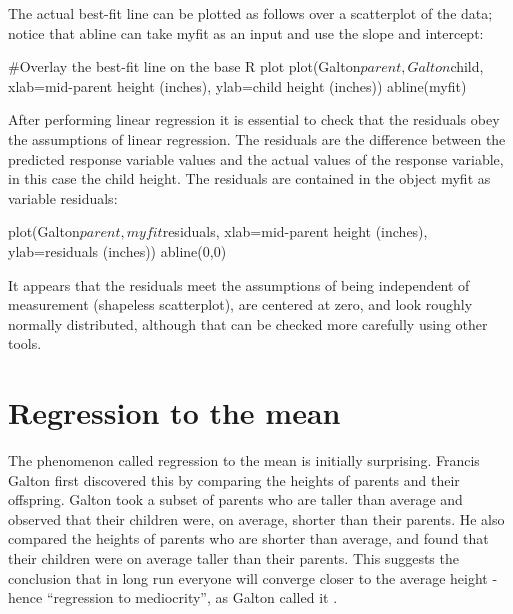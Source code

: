 \documentclass[
  letterpaper,
  DIV=11,
  numbers=noendperiod]{scrreprt}
\newenvironment{Shaded}{\begin{snugshade}}{\end{snugshade}}
\newcommand{\NormalTok}[1]{\textcolor[rgb]{0.00,0.23,0.31}{#1}}
\begin{document}
The actual best-fit line can be plotted as follows over a scatterplot of
the data; notice that abline can take myfit as an input and use the
slope and intercept:

\begin{Shaded}
\begin{Highlighting}[]
\NormalTok{\#Overlay the best{-}fit line on the base R plot}
\NormalTok{plot(Galton$parent, Galton$child, xlab=\textquotesingle{}mid{-}parent height (inches)\textquotesingle{}, ylab=\textquotesingle{}child height (inches)\textquotesingle{})}
\NormalTok{abline(myfit)}
\end{Highlighting}
\end{Shaded}

After performing linear regression it is essential to check that the
residuals obey the assumptions of linear regression. The residuals are
the difference between the predicted response variable values and the
actual values of the response variable, in this case the child height.
The residuals are contained in the object myfit as variable residuals:

\begin{Shaded}
\begin{Highlighting}[]
\NormalTok{plot(Galton$parent, myfit$residuals, xlab=\textquotesingle{}mid{-}parent height (inches)\textquotesingle{}, ylab=\textquotesingle{}residuals (inches)\textquotesingle{})}
\NormalTok{abline(0,0)}
\end{Highlighting}
\end{Shaded}

It appears that the residuals meet the assumptions of being independent
of measurement (shapeless scatterplot), are centered at zero, and look
roughly normally distributed, although that can be checked more
carefully using other tools.

\hypertarget{regression-to-the-mean}{%
\section{Regression to the mean}\label{regression-to-the-mean}}

\label{sec:bio8} The phenomenon called 
regression to the mean is initially surprising. Francis Galton first
discovered this by comparing the heights of parents and their offspring.
Galton took a subset of parents who are taller than average and observed
that their children were, on average, shorter than their parents. He
also compared the heights of parents who are shorter than average, and
found that their children were on average taller than their parents.
This suggests the conclusion that in long run everyone will converge
closer to the average height - hence ``regression to mediocrity'', as
Galton called it \cite{senn_francis_2011}.
\end{document}
